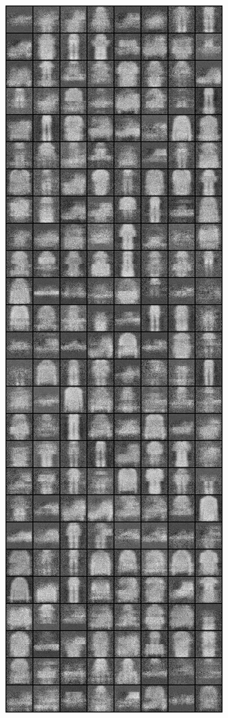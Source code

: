 \begin{figure}
\includegraphics[width=\picwidth\columnwidth]{figures/supplementary/alternative_fmnist/image_500.png}

\end{figure}
